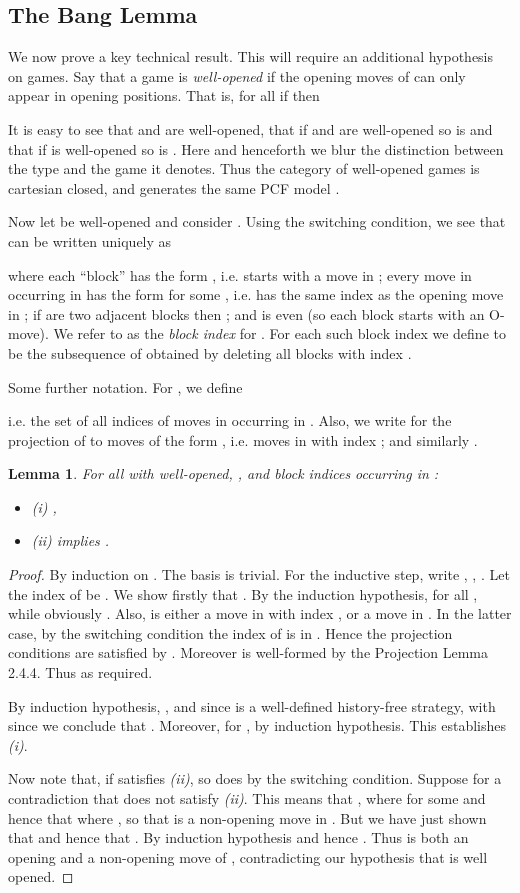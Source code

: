 \documentclass[11pt]{article}
\newtheorem{lemma}[theorem]{Lemma}
\newcommand{\ITEM}[1]{\begin{itemize} #1 \end{itemize}}
\begin{document}
\subsection{The Bang Lemma}

We now prove a key technical result. This will require an additional
hypothesis on games. Say that a game  is {\em well-opened} if the
opening moves of  can only appear in opening positions. That is,
for all  if  then

It is easy to see that  and  are well-opened, that if 
and  are well-opened so is  and that if  is
well-opened so is .
Here and henceforth we blur the distinction between the type  and
the game it denotes.
Thus the category of well-opened
games is cartesian closed, and generates the same PCF model
.


Now let  be well-opened and consider .
Using the switching condition, we see that  can be written uniquely
as

where each ``block''  has the form ,
i.e. starts with a move in ; every move in  occurring in
 has the form  for some , i.e. has the same
index as the opening move in ; if  are two adjacent
blocks then ; and  is even (so
each block starts with an O-move). We refer to   as the {\em
  block index} for . For each such block index  we define
 to be the subsequence of  obtained by deleting all blocks
with index .

Some further notation. For , we define

i.e. the set of all indices of moves in  occurring in . Also,
we write  for the projection of  to moves of the
form , i.e. moves in  with index ; and similarly
.

\begin{lemma}\label{disblock}
 For all  with  well-opened, ,
 and block indices  occurring in :
\ITEM{
\item[(i)] ,
\item[(ii)]  implies .
}
\end{lemma}
\begin{proof} By induction on . The basis is trivial. For the
inductive step, write ,
, . Let the index of
 be . We show firstly that . By the induction hypothesis, for all , while obviously .
Also,  is either a move in  with index , or a move in
. In the latter case, by the switching condition the index of 
is in .
Hence the projection conditions are satisfied
by . Moreover  is well-formed by the Projection Lemma
2.4.4.
Thus  as required.

By induction hypothesis, , and since
 is a well-defined history-free strategy, with
 since  we conclude that
. Moreover, for ,
 by induction hypothesis. This establishes
{\it (i)}.

Now note that, if  satisfies {\it (ii)}, so does  by the
switching condition. Suppose for a contradiction that  does
not satisfy {\it (ii)}. This means that , where  for some  and hence that  where , so that  is a non-opening
move in . But we have just shown that  and hence that . By induction hypothesis  and hence . Thus  is both an opening and a non-opening move of
, contradicting our hypothesis that  is well opened.
\end{proof}
\end{document}
